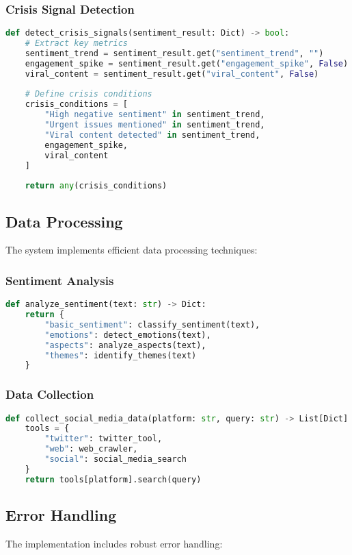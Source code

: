 \subsubsection{Crisis Signal Detection}
\begin{lstlisting}[language=Python]
def detect_crisis_signals(sentiment_result: Dict) -> bool:
    # Extract key metrics
    sentiment_trend = sentiment_result.get("sentiment_trend", "")
    engagement_spike = sentiment_result.get("engagement_spike", False)
    viral_content = sentiment_result.get("viral_content", False)
    
    # Define crisis conditions
    crisis_conditions = [
        "High negative sentiment" in sentiment_trend,
        "Urgent issues mentioned" in sentiment_trend,
        "Viral content detected" in sentiment_trend,
        engagement_spike,
        viral_content
    ]
    
    return any(crisis_conditions)
\end{lstlisting}

\subsection{Data Processing}
The system implements efficient data processing techniques:

\subsubsection{Sentiment Analysis}
\begin{lstlisting}[language=Python]
def analyze_sentiment(text: str) -> Dict:
    return {
        "basic_sentiment": classify_sentiment(text),
        "emotions": detect_emotions(text),
        "aspects": analyze_aspects(text),
        "themes": identify_themes(text)
    }
\end{lstlisting}

\subsubsection{Data Collection}
\begin{lstlisting}[language=Python]
def collect_social_media_data(platform: str, query: str) -> List[Dict]:
    tools = {
        "twitter": twitter_tool,
        "web": web_crawler,
        "social": social_media_search
    }
    return tools[platform].search(query)
\end{lstlisting}

\subsection{Error Handling}
The implementation includes robust error handling:

